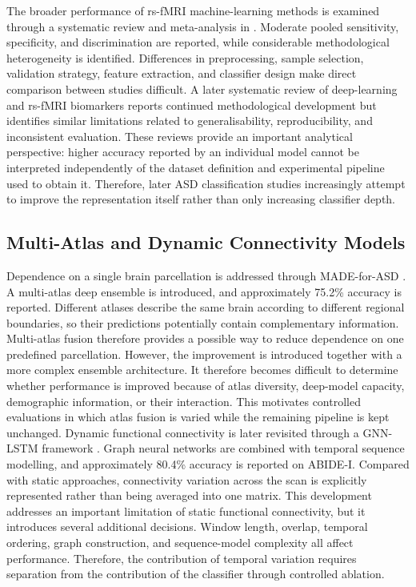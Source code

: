 The broader performance of rs-fMRI machine-learning methods is examined through a systematic review and meta-analysis in \cite{Santanaetal2022}. Moderate pooled sensitivity, specificity, and discrimination are reported, while considerable methodological heterogeneity is identified. Differences in preprocessing, sample selection, validation strategy, feature extraction, and classifier design make direct comparison between studies difficult. A later systematic review of deep-learning and rs-fMRI biomarkers \cite{Hudaetal2024} reports continued methodological development but identifies similar limitations related to generalisability, reproducibility, and inconsistent evaluation. These reviews provide an important analytical perspective: higher accuracy reported by an individual model cannot be interpreted independently of the dataset definition and experimental pipeline used to obtain it. Therefore, later ASD classification studies increasingly attempt to improve the representation itself rather than only increasing classifier depth.

\subsection{Multi-Atlas and Dynamic Connectivity Models}

Dependence on a single brain parcellation is addressed through MADE-for-ASD \cite{Liuetal2024MADE}. A multi-atlas deep ensemble is introduced, and approximately 75.2\% accuracy is reported. Different atlases describe the same brain according to different regional boundaries, so their predictions potentially contain complementary information. Multi-atlas fusion therefore provides a possible way to reduce dependence on one predefined parcellation. However, the improvement is introduced together with a more complex ensemble architecture. It therefore becomes difficult to determine whether performance is improved because of atlas diversity, deep-model capacity, demographic information, or their interaction. This motivates controlled evaluations in which atlas fusion is varied while the remaining pipeline is kept unchanged. Dynamic functional connectivity is later revisited through a GNN-LSTM framework \cite{Tangetal2025GNNLSTM}. Graph neural networks are combined with temporal sequence modelling, and approximately 80.4\% accuracy is reported on ABIDE-I. Compared with static approaches, connectivity variation across the scan is explicitly represented rather than being averaged into one matrix. This development addresses an important limitation of static functional connectivity, but it introduces several additional decisions. Window length, overlap, temporal ordering, graph construction, and sequence-model complexity all affect performance. Therefore, the contribution of temporal variation requires separation from the contribution of the classifier through controlled ablation.


